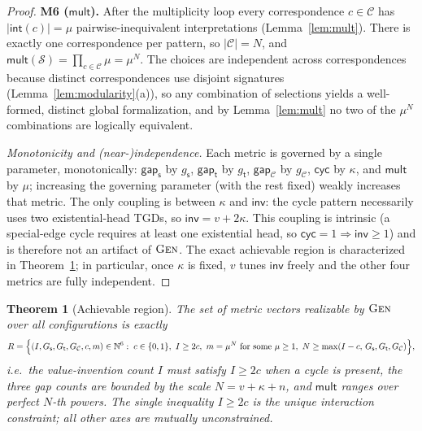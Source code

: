 \documentclass{amsart}
\newtheorem{theorem}{Theorem}
\theoremstyle{definition}
\newcommand{\src}{\mathsf{s}}
\newcommand{\trg}{\mathsf{t}}
\newcommand{\Scn}{\mathcal{S}}
\newcommand{\Cor}{\mathcal{C}}
\newcommand{\Nat}{\mathbb{N}}
\begin{document}
\begin{proof}
\textbf{M6 ($\mathsf{mult}$).} After the multiplicity loop every correspondence
$c\in\Cor$ has $|\mathsf{int}(c)|=\mu$ pairwise-inequivalent interpretations
(Lemma~\ref{lem:mult}). There is exactly one correspondence per pattern, so
$|\Cor|=N$, and
$\mathsf{mult}(\Scn)=\prod_{c\in\Cor}\mu=\mu^{N}$. The choices are independent
across correspondences because distinct correspondences use disjoint signatures
(Lemma~\ref{lem:modularity}(a)), so any combination of selections yields a
well-formed, distinct global formalization, and by Lemma~\ref{lem:mult} no two of
the $\mu^N$ combinations are logically equivalent.

\emph{Monotonicity and (near-)independence.} Each metric is governed by a single
parameter, monotonically: $\mathsf{gap}_\src$ by $g_\src$, $\mathsf{gap}_\trg$ by
$g_\trg$, $\mathsf{gap}_\Cor$ by $g_\Cor$, $\mathsf{cyc}$ by $\kappa$, and
$\mathsf{mult}$ by $\mu$; increasing the governing parameter (with the rest
fixed) weakly increases that metric. The only coupling is between $\kappa$ and
$\mathsf{inv}$: the cycle pattern necessarily uses two existential-head TGDs, so
$\mathsf{inv}=v+2\kappa$. This coupling is intrinsic (a special-edge cycle
requires at least one existential head, so $\mathsf{cyc}=1\Rightarrow
\mathsf{inv}\ge 1$) and is therefore not an artifact of $\textsc{Gen}$. The exact
achievable region is characterized in Theorem~\ref{thm:region}; in particular,
once $\kappa$ is fixed, $v$ tunes $\mathsf{inv}$ freely and the other four metrics
are fully independent.
\end{proof}

\begin{theorem}[Achievable region]\label{thm:region}
The set of metric vectors realizable by $\textsc{Gen}$ over all configurations is
exactly
\[
R=\Bigl\{(I,G_\src,G_\trg,G_\Cor,c,m)\in\Nat^6 :\;
c\in\{0,1\},\ I\ge 2c,\ m=\mu^{N}\text{ for some }\mu\ge1,\ N\ge \max(I-c,\,G_\src,G_\trg,G_\Cor)\Bigr\},
\]
i.e.\ the value-invention count $I$ must satisfy $I\ge 2c$ when a cycle is
present, the three gap counts are bounded by the scale $N=v+\kappa+n$, and
$\mathsf{mult}$ ranges over perfect $N$-th powers. The single inequality
$I\ge 2c$ is the unique interaction constraint; all other axes are mutually
unconstrained.
\end{theorem}
\end{document}
